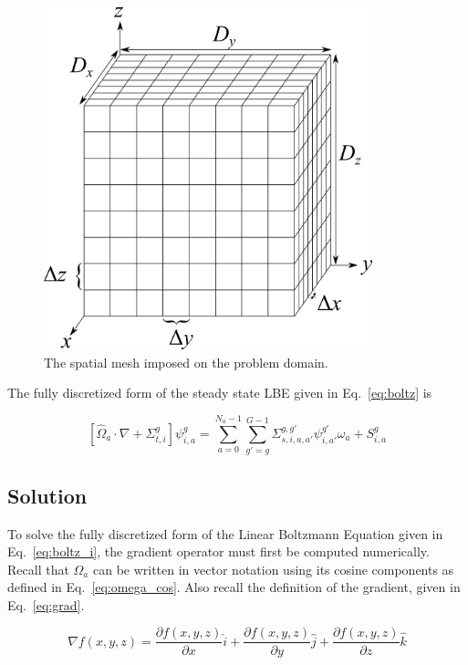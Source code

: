 \begin{figure}[tb]
  \begin{center}
   \includegraphics[width=3.75in]{figs/spatial_disc}
  \end{center}
  \caption{The spatial mesh imposed on the problem domain.}
\label{fig:spatial_disc}
\end{figure}

The fully discretized form of the steady state LBE given in Eq.~\ref{eq:boltz} is

\begin{equation} \label{eq:boltz_i}
\left[ \hat{\Omega}_a \cdot \nabla + \Sigma_{t,i}^g \right]
\psi_{i,a}^{g} = 
\sum_{a=0}^{N_a-1} \sum_{g'=g}^{G-1} \Sigma_{s, i, a, a'}^{g, g'} \psi_{i, a'}^{g'} \omega_a + S_{i,a}^g
\end{equation}

\subsection{Solution}

To solve the fully discretized form of the Linear Boltzmann Equation given in Eq.~\ref{eq:boltz_i}, the gradient operator must first be computed numerically. Recall that $\Omega_a$ can be written in vector notation using its cosine components as defined in Eq.~\ref{eq:omega_cos}. Also recall the definition of the gradient, given in Eq.~\ref{eq:grad}.

\begin{equation} \label{eq:grad}
\nabla f(x, y, z) = \frac{\partial f(x, y, z)}{\partial x} \hat{i} + \frac{\partial f(x, y, z)}{\partial y} \hat{j} + \frac{\partial f(x, y, z)}{\partial z} \hat{k}
\end{equation}

